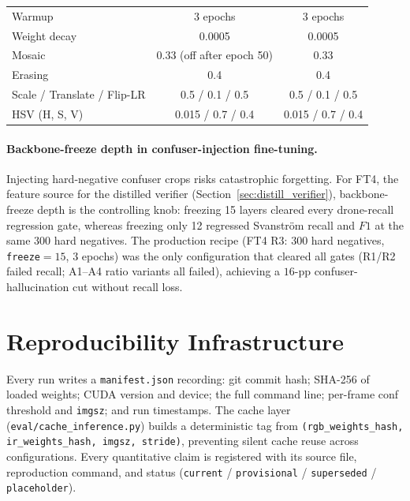 \begin{table}[htbp]
\begin{tabular}{lcc}
        Warmup            & 3 epochs                   & 3 epochs                                    \\
        Weight decay      & 0.0005                     & 0.0005                                      \\
        Mosaic            & 0.33 (off after epoch 50)  & 0.33                                        \\
        Erasing           & 0.4                        & 0.4                                         \\
        Scale / Translate / Flip-LR & 0.5 / 0.1 / 0.5  & 0.5 / 0.1 / 0.5                             \\
        HSV (H, S, V)     & 0.015 / 0.7 / 0.4          & 0.015 / 0.7 / 0.4                           \\
        \bottomrule
    \end{tabular}
\end{table}

\paragraph{Backbone-freeze depth in confuser-injection fine-tuning.}
Injecting hard-negative confuser crops risks catastrophic forgetting. For FT4, the feature source for the distilled verifier (Section~\ref{sec:distill_verifier}), backbone-freeze depth is the controlling knob: freezing 15 layers cleared every drone-recall regression gate, whereas freezing only 12 regressed Svanstr\"om recall and $F1$ at the same $300$ hard negatives. The production recipe (FT4 R3: $300$ hard negatives, \texttt{freeze}$=15$, $3$ epochs) was the only configuration that cleared all gates (R1/R2 failed recall; A1--A4 ratio variants all failed), achieving a $16$-pp confuser-hallucination cut without recall loss.

\section{Reproducibility Infrastructure}
\label{sec:reproducibility}

Every run writes a \texttt{manifest.json} recording: git commit hash; SHA-256 of loaded weights; CUDA version and device; the full command line; per-frame conf threshold and \texttt{imgsz}; and run timestamps. The cache layer (\texttt{eval/cache\_inference.py}) builds a deterministic tag from \texttt{(rgb\_weights\_hash, ir\_weights\_hash, imgsz, stride)}, preventing silent cache reuse across configurations. Every quantitative claim is registered with its source file, reproduction command, and status (\texttt{current} / \texttt{provisional} / \texttt{superseded} / \texttt{placeholder}).

